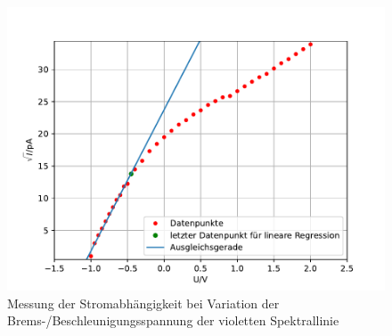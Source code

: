\begin{figure}[H]
  \centering
  \includegraphics{content/lila.pdf}
  \caption{Messung der Stromabhängigkeit bei Variation der Brems-/Beschleunigungsspannung der violetten Spektrallinie}
  \label{fig:violett}
\end{figure}

